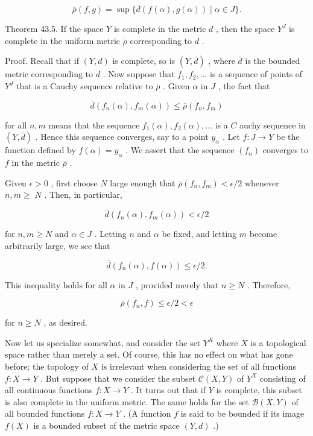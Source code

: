 \documentclass[10pt]{article}
\begin{document}
\[
\overline{\rho }\left( {f,g}\right)  = \sup \{ \bar{d}\left( {f\left( \alpha \right) ,g\left( \alpha \right) }\right)  \mid  \alpha  \in  J\} .
\]

Theorem 43.5. If the space \(Y\) is complete in the metric \(d\) , then the space \({Y}^{J}\) is complete in the uniform metric \(\overline{\rho }\) corresponding to \(d\) .

Proof. Recall that if \(\left( {Y,d}\right)\) is complete, so is \(\left( {Y,\bar{d}}\right)\) , where \(\bar{d}\) is the bounded metric corresponding to \(d\) . Now suppose that \({f}_{1},{f}_{2},\ldots\) is a sequence of points of \({Y}^{J}\) that is a Cauchy sequence relative to \(\overline{\rho }\) . Given \(\alpha\) in \(J\) , the fact that

\[
\bar{d}\left( {{f}_{n}\left( \alpha \right) ,{f}_{m}\left( \alpha \right) }\right)  \leq  \overline{\rho }\left( {{f}_{n},{f}_{m}}\right)
\]

for all \(n,m\) means that the sequence \({f}_{1}\left( \alpha \right) ,{f}_{2}\left( \alpha \right) ,\ldots\) is a \(C\) auchy sequence in \(\left( {Y,\bar{d}}\right)\) . Hence this sequence converges, say to a point \({y}_{\alpha }\) . Let \(f : J \rightarrow  Y\) be the function defined by \(f\left( \alpha \right)  = {y}_{\alpha }\) . We assert that the sequence \(\left( {f}_{n}\right)\) converges to \(f\) in the metric \(\overline{\rho }\) .

Given \(\epsilon  > 0\) , first choose \(N\) large enough that \(\overline{\rho }\left( {{f}_{n},{f}_{m}}\right)  < \epsilon /2\) whenever \(n,m \geq \; N\) . Then, in particular,

\[
\bar{d}\left( {{f}_{n}\left( \alpha \right) ,{f}_{m}\left( \alpha \right) }\right)  < \epsilon /2
\]

for \(n,m \geq  N\) and \(\alpha  \in  J\) . Letting \(n\) and \(\alpha\) be fixed, and letting \(m\) become arbitrarily large, we see that

\[
\bar{d}\left( {{f}_{n}\left( \alpha \right) ,f\left( \alpha \right) }\right)  \leq  \epsilon /2.
\]

This inequality holds for all \(\alpha\) in \(J\) , provided merely that \(n \geq  N\) . Therefore,

\[
\overline{\rho }\left( {{f}_{n},f}\right)  \leq  \epsilon /2 < \epsilon
\]

for \(n \geq  N\) , as desired.

Now let us specialize somewhat, and consider the set \({Y}^{X}\) where \(X\) is a topological space rather than merely a set. Of course, this has no effect on what has gone before; the topology of \(X\) is irrelevant when considering the set of all functions \(f : X \rightarrow  Y\) . But suppose that we consider the subset \(\mathcal{C}\left( {X,Y}\right)\) of \({Y}^{X}\) consisting of all continuous functions \(f : X \rightarrow  Y\) . It turns out that if \(Y\) is complete, this subset is also complete in the uniform metric. The same holds for the set \(\mathcal{B}\left( {X,Y}\right)\) of all bounded functions \(f : X \rightarrow  Y\) . (A function \(f\) is said to be bounded if its image \(f\left( X\right)\) is a bounded subset of the metric space \(\left( {Y,d}\right)\) .)
\end{document}
